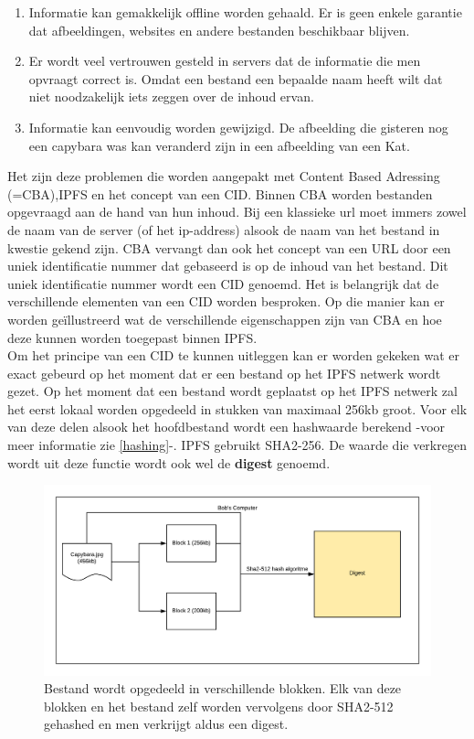 \begin{enumerate}
\item Informatie kan gemakkelijk offline worden gehaald. Er is geen enkele garantie dat afbeeldingen, websites en andere bestanden beschikbaar blijven.\\
\item Er wordt veel vertrouwen gesteld in servers dat de informatie die men opvraagt correct is. Omdat een bestand een bepaalde naam heeft wilt dat niet noodzakelijk iets zeggen over de inhoud ervan.\\
\item Informatie kan eenvoudig worden gewijzigd. De afbeelding die gisteren nog een capybara was kan veranderd zijn in een afbeelding van een Kat.\\
\end{enumerate}

Het zijn deze problemen die worden aangepakt met Content Based Adressing (=CBA),IPFS en het concept van een CID. Binnen CBA worden bestanden opgevraagd aan de hand van hun inhoud. Bij een klassieke url moet immers zowel de naam van de server (of het ip-address) alsook de naam van het bestand in kwestie gekend zijn. CBA vervangt dan ook het concept van een URL door een uniek identificatie nummer dat gebaseerd is op de inhoud van het bestand. Dit uniek identificatie nummer wordt een CID genoemd. Het is belangrijk dat de verschillende elementen van een CID worden besproken. Op die manier kan er worden geïllustreerd wat de verschillende eigenschappen zijn van CBA en hoe deze kunnen worden toegepast binnen IPFS.\\

Om het principe van een CID te kunnen uitleggen kan er worden gekeken wat er exact gebeurd op het moment dat er een bestand op het IPFS netwerk wordt gezet. Op het moment dat een bestand wordt geplaatst op het IPFS netwerk zal het eerst lokaal worden opgedeeld in stukken van maximaal 256kb groot. Voor elk van deze delen alsook het hoofdbestand wordt een hashwaarde berekend -voor meer informatie zie \ref{hashing}-. IPFS gebruikt SHA2-256. De waarde die verkregen wordt uit deze functie wordt ook wel de \textbf{digest} genoemd.\\

\begin{figure}[h!]
	\centering
		\includegraphics[scale=0.6]{ipfs-1.png}
	\caption[IPFS - Stap 1]{Bestand wordt opgedeeld in verschillende blokken. Elk van deze blokken en het bestand zelf worden vervolgens door SHA2-512 gehashed en men verkrijgt aldus een digest. }
\end{figure}

